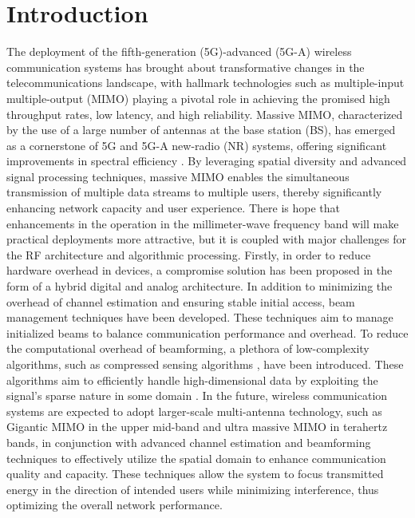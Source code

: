 \documentclass[lettersize,journal]{IEEEtran}
\begin{document}
\section{Introduction}
The deployment of the fifth-generation (5G)-advanced (5G-A) wireless communication systems has brought about transformative changes in the telecommunications landscape, with hallmark technologies such as multiple-input multiple-output (MIMO) playing a pivotal role in achieving the promised high throughput rates, low latency, and high reliability\cite{Heath2018mimo, 5GATutorial}. Massive MIMO, characterized by the use of a large number of antennas at the base station (BS)\cite{New5G}, has emerged as a cornerstone of 5G and 5G-A new-radio (NR) systems, offering significant improvements in spectral efficiency \cite{Emilmimo}. By leveraging spatial diversity and advanced signal processing techniques, massive MIMO enables the simultaneous transmission of multiple data streams to multiple users, thereby significantly enhancing network capacity and user experience\cite{rappaportmmWavebook, rappaportmmWave5G, emilten,shaomimo}. 
There is hope that enhancements in the operation in the millimeter-wave frequency band will make practical deployments more attractive\cite{mmWaveSuv}, but it is coupled with major challenges for the RF architecture and algorithmic processing. Firstly, in order to reduce hardware overhead in devices, a compromise solution has been proposed in the form of a hybrid digital and analog architecture\cite{heathcova}.  In addition to minimizing the overhead of channel estimation and ensuring stable initial access, beam management techniques have been developed\cite{BeamManagementSuv}. These techniques aim to manage initialized beams to balance communication performance and overhead\cite{heathmmwave}. To reduce the computational overhead of beamforming, a plethora of low-complexity algorithms, such as compressed sensing algorithms \cite{Heath2015ICASSP, HeathOMP}, have been introduced. These algorithms aim to efficiently handle high-dimensional data by exploiting the signal's sparse nature in some domain \cite{HeathSIP}.  In the future, wireless communication systems are expected to adopt larger-scale multi-antenna technology\cite{WangZheMag}, such as Gigantic MIMO in the upper mid-band\cite{GiganticMIMO} and
ultra massive MIMO in terahertz bands\cite{ningmimo}, in conjunction with advanced channel estimation and beamforming techniques to effectively utilize the spatial domain to enhance communication quality and capacity. These techniques allow the system to focus transmitted energy in the direction of intended users while minimizing interference, thus optimizing the overall network performance\cite{WangzheSuv}.
\end{document}
